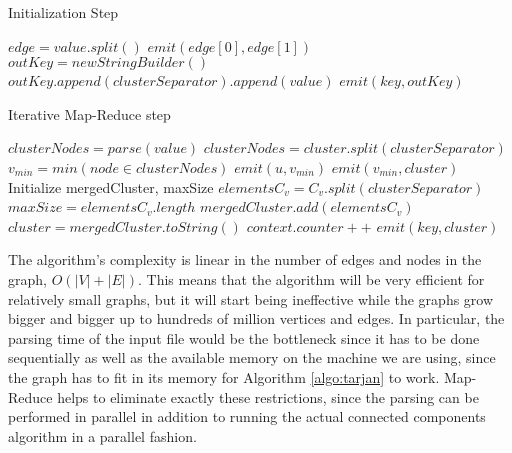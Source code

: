 \begin{algorithm}[!h]
	\caption{Initialization Step}
	\label{algo:first_step}
	\begin{algorithmic}[1]
			\State $edge = value.split() $
			\State $emit(edge[0], edge[1])$
		\EndFunction
			\State $outKey = new StringBuilder()$
				\State $outKey.append(clusterSeparator).append(value)$
			\EndFor
			\State $emit(key, outKey)$
		\EndFunction
	\end{algorithmic}
\end{algorithm}

\begin{algorithm}[!h]
	\caption{Iterative Map-Reduce step}
	\label{algo:second_step}
	\begin{algorithmic}[1]
			\State $clusterNodes = parse(value)$
			\State $clusterNodes = cluster.split(clusterSeparator)$
			\State $v_{min} = min(node \in clusterNodes)$
				\State $emit(u, v_{min})$
			\EndFor
			\State $emit(v_{min}, cluster)$
		\EndFunction
			\State Initialize mergedCluster, maxSize
				\State $elementsC_v = C_v.split(clusterSeparator)$
					\State $maxSize = elementsC_v.length$ 
				\EndIf
				\State $mergedCluster.add(elementsC_v)$
			\EndFor
			\State $cluster = mergedCluster.toString()$
				\State $context.counter++$
			\EndIf
			\State $emit(key, cluster)$
		\EndFunction
	\end{algorithmic}
\end{algorithm}

The algorithm's complexity is linear in the number of edges and nodes in the graph, \ie $O(|V| + |E|)$. This means that the algorithm will be very efficient for relatively small graphs, but it will start being ineffective while the graphs grow bigger and bigger up to hundreds of million vertices and edges. In particular, the parsing time of the input file would be the bottleneck since it has to be done sequentially as well as the available memory on the machine we are using, since the graph has to fit in its memory for Algorithm \ref{algo:tarjan} to work. Map-Reduce helps to eliminate exactly these restrictions, since the parsing can be performed in parallel in addition to running the actual connected components algorithm in a parallel fashion.

